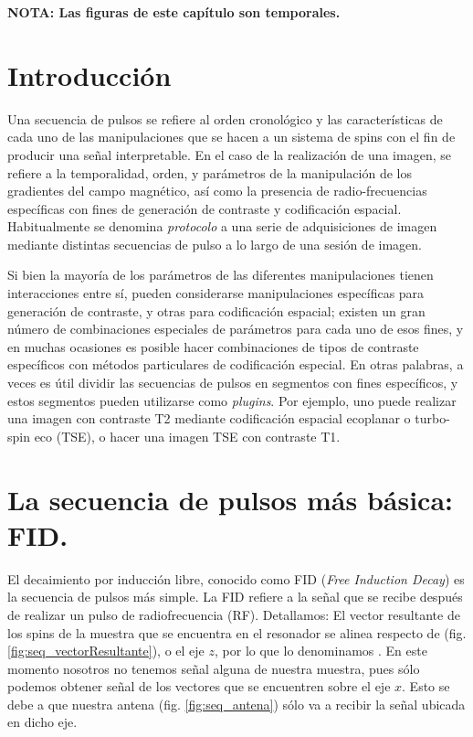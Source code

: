
\textbf{NOTA: Las figuras de este capítulo son temporales.}


\section{Introducción}
Una secuencia de pulsos se refiere al orden cronológico y las características de cada uno de las manipulaciones que se hacen a un sistema de spins con el fin de producir una señal interpretable. En el caso de la realización de una imagen, se refiere a la temporalidad, orden, y parámetros de la manipulación de los gradientes del campo magnético, así como la presencia de radio-frecuencias específicas con fines de generación de contraste y codificación espacial. Habitualmente se denomina \textit{protocolo}  a una serie de adquisiciones de imagen mediante distintas secuencias de pulso a lo largo de una sesión de imagen.

Si bien la mayoría de los parámetros de las diferentes manipulaciones tienen interacciones entre sí, pueden considerarse manipulaciones específicas para generación de contraste, y otras para codificación espacial; existen un gran número de combinaciones especiales de parámetros para cada uno de esos fines, y en muchas ocasiones es posible hacer combinaciones de tipos de contraste específicos con métodos particulares de codificación especial. En otras palabras, a veces es útil dividir las secuencias de pulsos en segmentos con fines específicos, y estos segmentos pueden utilizarse como \textit{plugins}. Por ejemplo, uno puede realizar una imagen con contraste T2 mediante codificación espacial ecoplanar o turbo-spin eco (TSE), o hacer una imagen TSE con contraste T1.

\section{La secuencia de pulsos más básica: FID.}
El decaimiento por inducción libre, conocido como FID (\textit{Free Induction Decay}) es la secuencia de pulsos más simple. La FID refiere a la señal que se recibe después de realizar un pulso de radiofrecuencia (RF). Detallamos: El vector resultante de los spins de la muestra que se encuentra en el resonador se alinea respecto de \Bzero (fig. \ref{fig:seq_vectorResultante}), o el eje $z$, por lo que lo denominamos \Mz. En este momento nosotros no tenemos señal alguna de nuestra muestra, pues sólo podemos obtener señal de los vectores que se encuentren sobre el eje $x$. Esto se debe a que nuestra antena (fig. \ref{fig:seq_antena}) sólo va a recibir la señal ubicada en dicho eje. 



